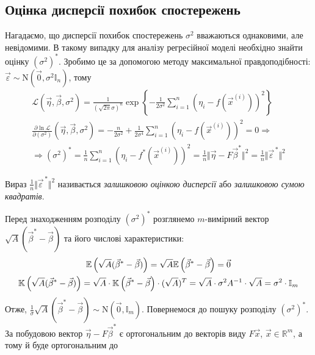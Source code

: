\subsection{Оцінка дисперсії похибок спостережень}
Нагадаємо, що дисперсії похибок спостережень $\sigma^2$ вважаються однаковими, але невідомими. В такому випадку для аналізу регресійної моделі
необхідно знайти оцінку $(\sigma^2)^*$. Зробимо це за допомогою методу максимальної правдоподібності: $\vec{\varepsilon} \sim \mathrm{N}(\vec{0}, \sigma^2 \mathbb{I}_n)$,
тому
\begin{gather*}
    \mathcal{L}(\vec{\eta}, \vec{\beta}, \sigma^2) = \frac{1}{(\sqrt{2\pi} \sigma)^n} \exp \left\{ 
        -\frac{1}{2\sigma^2} \sum\limits_{i=1}^n \left(\eta_i - f\left(\vec{x}^{(i)}\right)\right)^2
    \right\} \\
    \frac{\partial \ln \mathcal{L}}{\partial (\sigma^2)} (\vec{\eta}, \vec{\beta}, \sigma^2) 
    = -\frac{n}{2\sigma^2} + \frac{1}{2\sigma^4} \sum\limits_{i=1}^n \left(\eta_i - f\left(\vec{x}^{(i)}\right)\right)^2 = 0 \Rightarrow \\ \Rightarrow
    (\sigma^2)^* = \frac{1}{n} \sum\limits_{i=1}^n \left(\eta_i - f^*\left(\vec{x}^{(i)}\right)\right)^2 =
    \frac{1}{n} \Vert \vec{\eta} - F \vec{\beta}^* \Vert^2 = \frac{1}{n} \Vert \vec{\varepsilon}^{\,*}\Vert^2
\end{gather*}
\begin{definition}
    Вираз $\frac{1}{n} \Vert \vec{\varepsilon}^{\,*}\Vert^2$ називається \emph{залишковою оцінкою дисперсії} або
    \emph{залишковою сумою квадратів}.
\end{definition}
Перед знаходженням розподілу $(\sigma^2)^*$ розглянемо $m$-вимірний вектор $\sqrt{A}(\vec{\beta}^* - \vec{\beta})$ та його числові характеристики:
\begin{gather*}
    \mathbb{E} \left(\sqrt{A}(\vec{\beta}^* - \vec{\beta})\right) = \sqrt{A} \mathbb{E} \left(\vec{\beta}^* - \vec{\beta}\right) = \vec{0} \\
    \mathbb{K} \left(\sqrt{A}(\vec{\beta}^* - \vec{\beta})\right) = \sqrt{A} \cdot \mathbb{K} \left(\vec{\beta}^* - \vec{\beta}\right) \cdot (\sqrt{A})^T = 
    \sqrt{A} \cdot \sigma^2 A^{-1} \cdot \sqrt{A} = \sigma^2 \cdot \mathbb{I}_m
\end{gather*}
Отже, $\frac{1}{\sigma} \sqrt{A}(\vec{\beta}^* - \vec{\beta}) \sim \mathrm{N}(\vec{0}, \mathbb{I}_m)$. Повернемося до пошуку розподілу $(\sigma^2)^*$.
За побудовою вектор $\vec{\eta} - F \vec{\beta}^*$ є ортогональним до векторів виду $F\vec{x}$, $\vec{x} \in \mathbb{R}^m$, а тому й буде ортогональним до 
